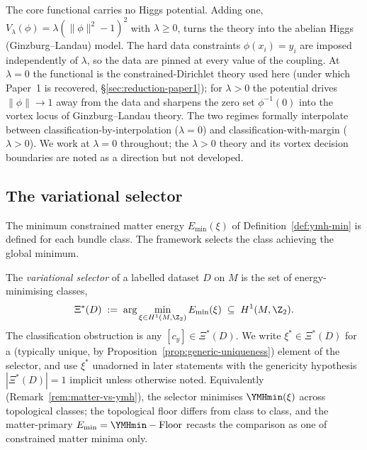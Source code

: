 \begin{remark}\label{rem:higgs-potential}
The core functional carries no Higgs potential. Adding one,
$V_\lambda(\phi)=\lambda(\|\phi\|^2-1)^2$ with $\lambda\geq 0$, turns
the theory into the abelian Higgs (Ginzburg--Landau) model. The hard
data constraints $\phi(x_i)=y_i$ are imposed independently of $\lambda$,
so the data are pinned at every value of the coupling. At $\lambda=0$
the functional is the constrained-Dirichlet theory used here (under
which Paper~1 is recovered, \S\ref{sec:reduction-paper1}); for
$\lambda>0$ the potential drives $\|\phi\|\to 1$ away from the data
and sharpens the zero set $\phi^{-1}(0)$ into the vortex locus of
Ginzburg--Landau theory. The two regimes formally interpolate between
classification-by-interpolation ($\lambda=0$) and classification-with-margin
($\lambda>0$). We work at $\lambda=0$ throughout; the $\lambda>0$
theory and its vortex decision boundaries are noted as a direction
but not developed.
\end{remark}

\subsection{The variational selector}\label{ssec:ymh-selector}

The minimum constrained matter energy $E_{\min}(\xi)$ of
Definition~\ref{def:ymh-min} is defined for each bundle class. The
framework selects the class achieving the global minimum.

\begin{definition}\label{def:variational-selector}
The \emph{variational selector} of a labelled dataset $D$ on $M$ is
the set of energy-minimising classes,
\[
   \Xi^*(D) \;:=\; \arg\min_{\xi\in H^1(M,\Z_2)} E_{\min}(\xi)
   \;\subseteq\; H^1(M,\Z_2).
\]
The classification obstruction is any $[c_y]\in\Xi^*(D)$. We write
$\xi^*\in\Xi^*(D)$ for a (typically unique, by
Proposition~\ref{prop:generic-uniqueness}) element of the selector,
and use $\xi^*$ unadorned in later statements with the genericity
hypothesis $|\Xi^*(D)|=1$ implicit unless otherwise noted.
Equivalently (Remark~\ref{rem:matter-vs-ymh}), the selector
minimises $\YMHmin(\xi)$ across topological classes; the topological
floor differs from class to class, and the matter-primary
$E_{\min}=\YMHmin-\mathrm{Floor}$ recasts the comparison as one of
constrained matter minima only.
\end{definition}

